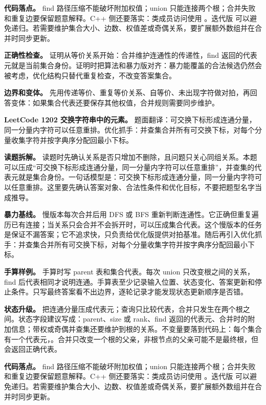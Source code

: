 \textbf{代码落点。} find 路径压缩不能破坏附加权值；union 只能连接两个根；合并失败和重复边要保留题意解释。C++ 侧还要落实：类成员访问使用 。迭代版  可以避免递归。若需要维护集合大小、边数、权值差或奇偶关系，要扩展额外数组并在合并时同步更新。

\textbf{正确性检查。} 证明从等价关系开始：合并维护连通性的传递性，find 返回的代表元就是当前集合身份。证明时把算法和暴力版对齐：暴力能覆盖的合法候选仍然会被考虑，优化结构只替代重复检查，不改变答案集合。

\textbf{边界和变体。} 先用传递等价、重复等价关系、自等价、未出现字符做对拍，再回答变体：如果集合代表还要保存其他权值，合并规则需要同步维护。

\noindent\textbf{LeetCode 1202 交换字符串中的元素。} 题面翻译：可交换下标形成连通分量，同一分量内字符可以任意重排。优化抓手：并查集合并所有可交换下标，对每个分量收集字符并按字典序分配回最小下标。

\textbf{读题拆解。} 读题时先确认关系是否只增加不删除，且问题只关心同组关系。本题可以压成“可交换下标形成连通分量，同一分量内字符可以任意重排”，并查集的代表元就是集合身份。一句话模型是：可交换下标形成连通分量，同一分量内字符可以任意重排。这里要先确认答案对象、合法性条件和优化目标，不要把题型名字当成推导。

\textbf{暴力基线。} 慢版本每次合并后用 DFS 或 BFS 重新判断连通性。它正确但重复遍历已有连接；当关系只会合并不会拆开时，可以压成集合代表。这个慢版本的任务是保证不漏答案；它不追求快，只负责给优化版提供对拍基准。随后再引入优化抓手：并查集合并所有可交换下标，对每个分量收集字符并按字典序分配回最小下标。

\textbf{手算样例。} 手算时写 parent 表和集合代表。每次 union 只改变根之间的关系，find 后代表相同才说明连通。手算表至少记录输入位置、状态变化、答案更新和停止条件。只写最终答案看不出边界，逐轮记录才能发现状态更新顺序是否错。

\textbf{状态升级。} 把连通分量压成代表元；查询只比较代表，合并只发生在两个根之间。状态字段建议写成：parent、size 或 rank、find 返回的代表元、合并时的附加信息；带权或奇偶并查集还要维护到根的关系。不变量要落到代码上：每个集合有一个代表元，。合并只改变一个根的父亲，非根节点的父亲可能不是最终根，但  会返回正确代表。

\textbf{代码落点。} find 路径压缩不能破坏附加权值；union 只能连接两个根；合并失败和重复边要保留题意解释。C++ 侧还要落实：类成员访问使用 。迭代版  可以避免递归。若需要维护集合大小、边数、权值差或奇偶关系，要扩展额外数组并在合并时同步更新。

